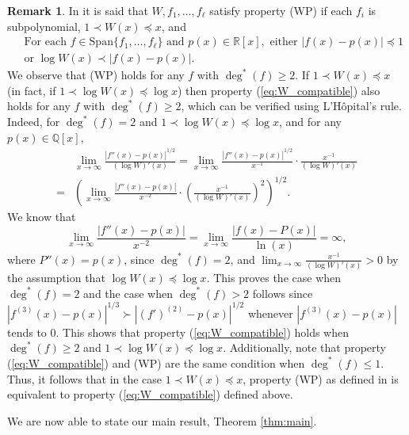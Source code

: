 \documentclass[12pt]{article}
\theoremstyle{plain} %
\theoremstyle{definition} %
\newtheorem{remark}[theorem]{Remark}
\theoremstyle{plain}
\theoremstyle{plain}
\numberwithin{equation}{section}
\newcommand{\R}{\mathbb{R}}
\newcommand{\Q}{\mathbb{Q}}
\renewcommand{\leq}{\leqslant}
\renewcommand{\geq}{\geqslant}
\newcommand{\1}{\mathbbm{1}}
\newcommand{\oo}{\infty}
\begin{document}
\begin{remark}\label{remark:WP}
In \cite[Section 6]{BMR24} it is said that $W,f_1,\dots, f_{\ell}$ satisfy property (WP) if each $f_i$ is subpolynomial, $1\prec W(x)\preceq x$, and 
\begin{align*}
    &\text{ For each }f\in \text{Span}\{f_1,\dots, f_{\ell}\} \text{ and } p(x)\in \R[x],\text{ either } |f(x)-p(x)|\preceq 1\\ &\text{ or } \log W(x)\prec |f(x)-p(x)|\tag{WP}.
\end{align*}
We observe that (WP) holds for any $f$ with $\deg^*(f)\geq 2$. If $1\prec W(x)\preceq x$ (in fact, if $1\prec \log W(x)\preceq \log x$) then property (\ref{eq:W_compatible}) also holds for any $f$ with $\deg^*(f)\geq 2$, which can be verified using L'H\^opital's rule. Indeed, for $\deg^*(f)= 2$ and $1\prec \log W(x)\preceq \log x$, and for any $p(x)\in \Q[x]$, 
\begin{align*}
    &\lim_{x\to\oo}\frac{|f''(x)-p(x)|^{1/2}}{(\log W)'(x)} = \lim_{x\to\oo}\frac{|f''(x)-p(x)|^{1/2}}{x^{-1}}\cdot \frac{x^{-1}}{(\log W)'(x)}\\ 
    =& \left(\lim_{x\to\oo}\frac{|f''(x)-p(x)|}{x^{-2}}\cdot \left(\frac{x^{-1}}{(\log W)'(x)}\right)^2\right)^{1/2}.
\end{align*}
We know that 
\begin{equation*}
    \lim_{x\to\oo}\frac{|f''(x)-p(x)|}{x^{-2}}=\lim_{x\to\oo}\frac{|f(x)-P(x)|}{\ln(x)} =\oo,
\end{equation*}
where $P''(x)=p(x)$, since $\deg^*(f)=2$, and $\lim_{x\to\oo}\frac{x^{-1}}{(\log W)'(x)}>0$ by the assumption that $\log W(x)\preceq \log x$. This proves the case when $\deg^*(f)=2$ and the case when $\deg^*(f)>2$ follows since $|f^{(3)}(x)-p(x)|^{1/3}\succ |(f')^{(2)}-p(x)|^{1/2}$ whenever $|f^{(3)}(x)-p(x)|$ tends to $0$. This shows that property (\ref{eq:W_compatible}) holds when $\deg^*(f)\geq 2$ and $1\prec \log W(x)\preceq \log x$. 
Additionally, note that property (\ref{eq:W_compatible}) and (WP) are the same condition when $\deg^*(f)\leq 1$. Thus, it follows that in the case $1\prec W(x)\preceq x$, property (WP) as defined in \cite{BMR24} is equivalent to property (\ref{eq:W_compatible}) defined above.
\end{remark}

We are now able to state our main result, Theorem \ref{thm:main}. 
\end{document}
